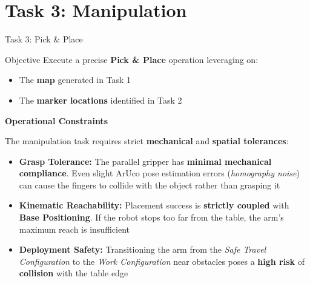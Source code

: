 \section{Task 3: Manipulation}
\label{sec: Task 3}

\begin{frame}{Task 3: Pick \& Place}

    \begin{block}{Objective}
        Execute a precise \textbf{Pick \& Place} operation leveraging on:
        \begin{itemize}
            \item The \textbf{map} generated in Task 1
            \item The \textbf{marker locations} identified in Task 2
        \end{itemize}
    \end{block}

    \vspace{0.1cm}

    \textbf{Operational Constraints}
    \par
    The manipulation task requires strict \textbf{mechanical} and \textbf{spatial tolerances}:
    \vspace{0.2cm}
    \begin{itemize}
        \item \textbf{Grasp Tolerance:} The parallel gripper has \textbf{minimal mechanical compliance}. Even slight ArUco pose estimation errors (\textit{homography noise}) can cause the fingers to collide with the object rather than grasping it
    
        \item \textbf{Kinematic Reachability:} Placement success is \textbf{strictly coupled} with \textbf{Base Positioning}. If the robot stops too far from the table, the arm's maximum reach is insufficient
        
        \item \textbf{Deployment Safety:} Transitioning the arm from the \textit{Safe Travel Configuration} to the \textit{Work Configuration} near obstacles poses a \textbf{high risk} of \textbf{collision} with the table edge
    \end{itemize}

\end{frame}

